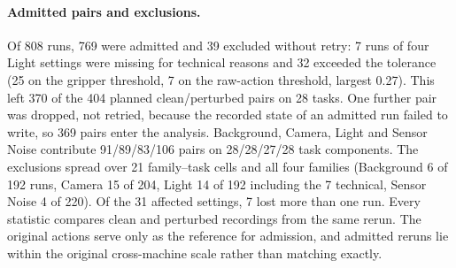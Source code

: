 \paragraph{Admitted pairs and exclusions.}
Of 808 runs, 769 were admitted and 39 excluded without retry: 7 runs of four Light settings were missing for technical reasons and 32 exceeded the tolerance (25 on the gripper threshold, 7 on the raw-action threshold, largest 0.27). This left 370 of the 404 planned clean/perturbed pairs on 28 tasks. One further pair was dropped, not retried, because the recorded state of an admitted run failed to write, so 369 pairs enter the analysis. Background, Camera, Light and Sensor Noise contribute 91/89/83/106 pairs on 28/28/27/28 task components. The exclusions spread over 21 family--task cells and all four families (Background 6 of 192 runs, Camera 15 of 204, Light 14 of 192 including the 7 technical, Sensor Noise 4 of 220). Of the 31 affected settings, 7 lost more than one run. Every statistic compares clean and perturbed recordings from the same rerun. The original actions serve only as the reference for admission, and admitted reruns lie within the original cross-machine scale rather than matching exactly.

